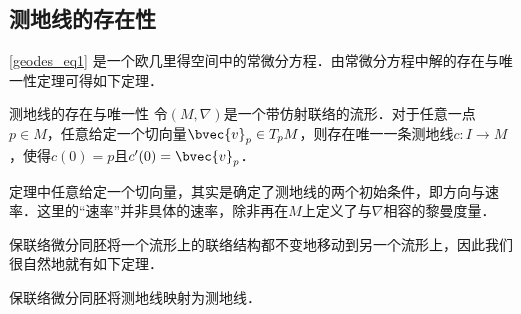 \subsection{测地线的存在性}

\autoref{geodes_eq1} 是一个欧几里得空间中的常微分方程．由常微分方程中解的存在与唯一性定理可得如下定理．

\begin{theorem}{测地线的存在与唯一性}
令$(M, \nabla)$是一个带仿射联络的流形．对于任意一点$p\in M$，任意给定一个切向量$\bvec{v}_p\in T_pM$，则存在唯一一条测地线$c:I\to M$，使得$c(0)=p$且$c'(0)=\bvec{v}_p$．
\end{theorem}

定理中任意给定一个切向量，其实是确定了测地线的两个初始条件，即方向与速率．这里的“速率”并非具体的速率，除非再在$M$上定义了与$\nabla$相容的黎曼度量．

保联络微分同胚将一个流形上的联络结构都不变地移动到另一个流形上，因此我们很自然地就有如下定理．

\begin{theorem}{}
保联络微分同胚将测地线映射为测地线．
\end{theorem}















